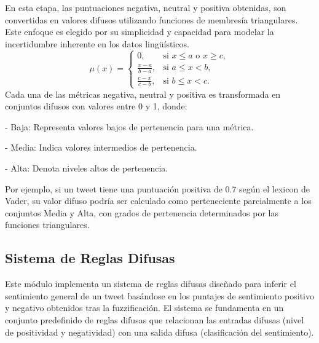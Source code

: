 \documentclass[sigconf, review=false, nonacm]{acmart}
\begin{document}
En esta etapa, las puntuaciones negativa, neutral y positiva obtenidas, son convertidas en valores difusos
utilizando funciones de membresía triangulares. Este enfoque es elegido por su simplicidad y capacidad para
modelar la incertidumbre inherente en los datos lingüísticos.
$$
	\mu(x) =
	\begin{cases}
		0,                   & \text{si } x \leq a \text{ o } x \geq c, \\
		\frac{x - a}{b - a}, & \text{si } a \leq x < b,                 \\
		\frac{c - x}{c - b}, & \text{si } b \leq x < c.
	\end{cases}
$$
Cada una de las métricas negativa, neutral y positiva es transformada en conjuntos difusos con valores
entre 0 y 1, donde:

- Baja: Representa valores bajos de pertenencia para una métrica.

- Media: Indica valores intermedios de pertenencia.

- Alta: Denota niveles altos de pertenencia.

Por ejemplo, si un tweet tiene una puntuación positiva de 0.7 según el lexicon de Vader,
su valor difuso podría ser calculado como perteneciente parcialmente a los conjuntos Media y Alta,
con grados de pertenencia determinados por las funciones triangulares.

\subsection{Sistema de Reglas Difusas}
Este módulo implementa un sistema de reglas difusas diseñado para inferir el sentimiento general de un
tweet basándose en los puntajes de sentimiento positivo y negativo obtenidos tras la fuzzificación.
El sistema se fundamenta en un conjunto predefinido de reglas difusas que relacionan las entradas
difusas (nivel de positividad y negatividad) con una salida difusa (clasificación del sentimiento).
\end{document}
